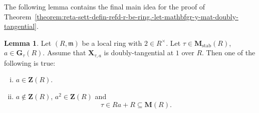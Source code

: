 \documentclass[reqno]{amsart}
\DeclareMathOperator{\stab}{stab}
\theoremstyle{plain} \newtheorem{theorem} {Theorem} \newtheorem{conjecture} {Conjecture} \newtheorem{corollary} [theorem] {Corollary} \newtheorem{proposition} [theorem] {Proposition} \newtheorem{fact} [theorem] {Fact}
\theoremstyle{definition} \newtheorem{definition} [theorem] {Definition}
\theoremstyle{itplain} %
\newtheorem{lemma}[theorem]{Lemma}
\begin{document}
The following lemma contains the final main idea for the proof of Theorem~\ref{theorem:reta-sett-defin-refd-r-be-ring.-let-mathbfgr-y-mat-doubly-tangential}.
\begin{lemma}\label{lemma:let-r-mathfr-be-local-ring-with-2-in-rtim-let-tau-a-in-Z-or-tau-in-rank-two}
  Let $(R,\mathfrak{m})$ be a local ring with $2 \in R^\times$.  Let $\tau \in \mathbf{M}_{\stab}(R)$, $a \in \mathbf{G}_{\tau}(R)$.  Assume that $\mathbf{X}_{\tau,a}$ is doubly-tangential at $1$ over $R$.  Then one of the following is true:
  \begin{enumerate}[(i)]
  \item $a \in \mathbf{Z}(R)$.
  \item $a \notin \mathbf{Z}(R)$, $a^2 \in \mathbf{Z}(R)$ and
    \begin{equation*}
      \tau \in R a + R \subseteq \mathbf{M}(R).
    \end{equation*}
  \end{enumerate}
\end{lemma}
\end{document}
